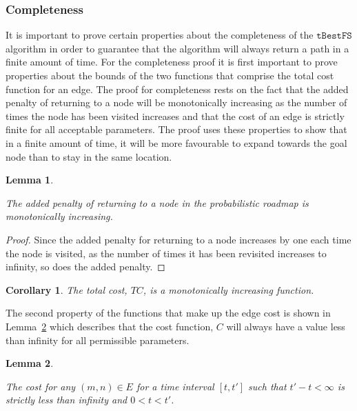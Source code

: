 \documentclass[letterpaper, 10pt, conference]{ieeeconf}
\newcommand{\Acronym}[1]{\ensuremath{{{\texttt{#1}}}}}
\newtheorem{lemma}{Lemma}
\newtheorem{corollary}{Corollary}
\begin{document}
\subsubsection{Completeness}

It is important to prove certain properties about the completeness of the
$\Acronym{tBestFS}$ algorithm in order to guarantee that the algorithm will
always return a path in a finite amount of time. For the completeness proof it
is first important to prove properties about the bounds of the two functions
that comprise the total cost function for an edge. The proof for completeness
rests on the fact that the added penalty of returning to a node will be
monotonically increasing as the number of times the node has been visited
increases and that the cost of an edge is strictly finite for all acceptable
parameters. The proof uses these properties to show that in a finite amount of
time, it will be more favourable to expand towards the goal node than to stay
in the same location.

\begin{lemma}

    \label{theorem:increasing}

    The added penalty of returning to a node in the probabilistic roadmap is
    monotonically increasing.

\end{lemma}

\begin{proof}

    Since the added penalty for returning to a node increases by one each time
    the node is visited, as the number of times it has been revisited increases
    to infinity, so does the added penalty.

\end{proof}

\begin{corollary}

    The total cost, $TC$, is a monotonically increasing function.

\end{corollary}

The second property of the functions that make up the edge cost is shown in
Lemma~\ref{theorem:capped} which describes that the cost function, $C$ will
always have a value less than infinity for all permissible parameters.

\begin{lemma}

    \label{theorem:capped}

    The cost for any $(m, n) \in E$ for a time interval $[t, t']$ such that $t'
    - t < \infty$ is strictly less than infinity and $0 < t < t'$.

\end{lemma}
\end{document}
